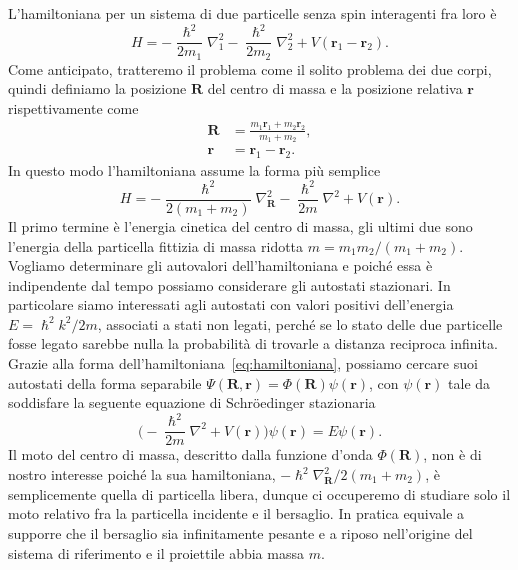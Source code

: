 \documentclass[a4paper,fleqn,twoside,12pt]{article}
\begin{document}
L'hamiltoniana per un sistema di due particelle senza spin interagenti fra loro
è
\begin{equation}
  H = -\frac{\hslash^{2}}{2m_{1}} \nabla_{1}^{2}
  -\frac{\hslash^{2}}{2m_{2}}\nabla_{2}^{2} + V(\bm{r}_{1} - \bm{r}_{2}).
\end{equation}
Come anticipato, tratteremo il problema come il solito problema dei due corpi,
quindi definiamo la posizione $\bm{R}$ del centro di massa e la posizione
relativa $\bm{r}$ rispettivamente come
\begin{subequations}
  \begin{align}
    \bm{R} &= \frac{m_{1}\bm{r}_{1} + m_{2}\bm{r}_{2}}{m_{1} + m_{2}}, \\
    \bm{r} &= \bm{r}_{1} - \bm{r}_{2}.
  \end{align}
\end{subequations}
In questo modo l'hamiltoniana assume la forma più semplice
\begin{equation}
  \label{eq:hamiltoniana}
  H = -\frac{\hslash^{2}}{2(m_{1} + m_{2})}\nabla_{\bm{R}}^{2} -
  \frac{\hslash^{2}}{2m}\nabla^{2} + V(\bm{r}).
\end{equation}
Il primo termine è l'energia cinetica del centro di massa, gli ultimi due sono
l'energia della particella fittizia di massa ridotta
$m = m_{1}m_{2}/(m_{1}+m_{2})$.  Vogliamo determinare gli autovalori
dell'hamiltoniana e poiché essa è indipendente dal tempo possiamo considerare
gli autostati stazionari.  In particolare siamo interessati agli autostati con
valori positivi dell'energia $E = \hslash^{2}k^{2}/2m$, associati a stati non
legati, perché se lo stato delle due particelle fosse legato sarebbe nulla la
probabilità di trovarle a distanza reciproca infinita.  Grazie alla forma
dell'hamiltoniana~\eqref{eq:hamiltoniana}, possiamo cercare suoi autostati della
forma separabile $\Psi(\bm{R}, \bm{r}) = \Phi(\bm{R})\psi(\bm{r})$, con
$\psi(\bm{r})$ tale da soddisfare la seguente equazione di Schröedinger
stazionaria
\begin{equation}
  \label{eq:schroedinger-stazionaria}
  \bigg(-\frac{\hslash^{2}}{2m}\nabla^{2} + V(\bm{r})\bigg)\psi(\bm{r})
  = E\psi(\bm{r}).
\end{equation}
Il moto del centro di massa, descritto dalla funzione d'onda $\Phi(\bm{R})$, non
è di nostro interesse poiché la sua hamiltoniana,
$-\hslash^{2}\nabla_{\bm{R}}^{2}/2(m_{1} + m_{2})$, è semplicemente quella di
particella libera, dunque ci occuperemo di studiare solo il moto relativo fra la
particella incidente e il bersaglio.  In pratica equivale a supporre che il
bersaglio sia infinitamente pesante e a riposo nell'origine del sistema di
riferimento e il proiettile abbia massa $m$.
\end{document}
